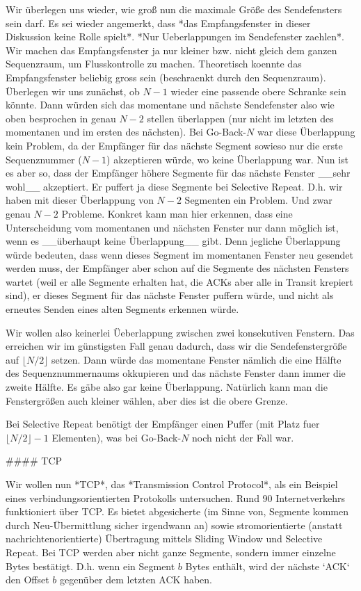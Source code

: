 Wir überlegen uns wieder, wie groß nun die maximale Größe des Sendefensters sein
darf. Es sei wieder angemerkt, dass *das Empfangsfenster in dieser Diskussion
keine Rolle spielt*. *Nur Ueberlappungen im Sendefenster zaehlen*. Wir machen
das Empfangsfenster ja nur kleiner bzw. nicht gleich dem ganzen Sequenzraum, um
Flusskontrolle zu machen. Theoretisch koennte das Empfangsfenster beliebig gross
sein (beschraenkt durch den Sequenzraum). Überlegen wir uns zunächst, ob $N - 1$
wieder eine passende obere Schranke sein könnte. Dann würden sich das momentane
und nächste Sendefenster also wie oben besprochen in genau $N - 2$ stellen
überlappen (nur nicht im letzten des momentanen und im ersten des nächsten). Bei
Go-Back-$N$ war diese Überlappung kein Problem, da der Empfänger für das nächste
Segment sowieso nur die erste Sequenznummer ($N - 1$) akzeptieren würde, wo
keine Überlappung war. Nun ist es aber so, dass der Empfänger höhere Segmente
für das nächste Fenster __sehr wohl__ akzeptiert. Er puffert ja diese Segmente
bei Selective Repeat. D.h. wir haben mit dieser Überlappung von $N - 2$
Segmenten ein Problem. Und zwar genau $N - 2$ Probleme. Konkret kann man hier
erkennen, dass eine Unterscheidung vom momentanen und nächsten Fenster nur dann
möglich ist, wenn es __überhaupt keine Überlappung__ gibt. Denn jegliche
Überlappung würde bedeuten, dass wenn dieses Segment im momentanen Fenster neu
gesendet werden muss, der Empfänger aber schon auf die Segmente des nächsten
Fensters wartet (weil er alle Segmente erhalten hat, die ACKs aber alle in
Transit krepiert sind), er dieses Segment für das nächste Fenster puffern würde,
und nicht als erneutes Senden eines alten Segments erkennen würde.

Wir wollen also keinerlei Üeberlappung zwischen zwei konsekutiven Fenstern. Das
erreichen wir im günstigsten Fall genau dadurch, dass wir die Sendefenstergröße
auf $\lfloor N/2 \rfloor$ setzen. Dann würde das momentane Fenster nämlich die
eine Hälfte des Sequenznummernaums okkupieren und das nächste Fenster dann immer
die zweite Hälfte. Es gäbe also gar keine Überlappung. Natürlich kann man die
Fenstergrößen auch kleiner wählen, aber dies ist die obere Grenze.

Bei Selective Repeat benötigt der Empfänger einen Puffer (mit Platz fuer
$\lfloor N/2 \rfloor - 1$ Elementen), was bei Go-Back-$N$ noch nicht der Fall
war.

#### TCP

Wir wollen nun *TCP*, das *Transmission Control Protocol*, als ein Beispiel
eines verbindungsorientierten Protokolls untersuchen. Rund 90%
Internetverkehrs funktioniert über TCP. Es bietet abgesicherte (im Sinne von,
Segmente kommen durch Neu-Übermittlung sicher irgendwann an) sowie
stromorientierte (anstatt nachrichtenorientierte) Übertragung mittels Sliding
Window und Selective Repeat. Bei TCP werden aber nicht ganze Segmente, sondern
immer einzelne Bytes bestätigt. D.h. wenn ein Segment $b$ Bytes enthält, wird
der nächste `ACK` den Offset $b$ gegenüber dem letzten ACK haben.

